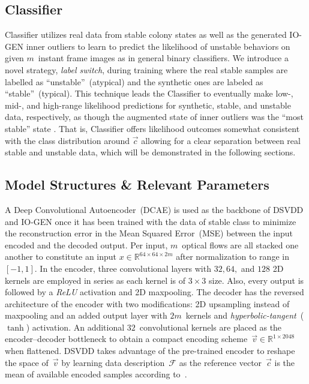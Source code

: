 \documentclass[letterpaper]{article} %
\begin{document}
\subsection{Classifier}
\label{sec:classifier}

Classifier utilizes real data from stable colony states as well as the
generated \mbox{IO-GEN} inner outliers to learn to predict the likelihood of
unstable behaviors on given $m$~instant frame images as in general
binary classifiers. We introduce a novel strategy, \emph{label switch}, during
training where the real stable samples are labelled as
``unstable''~(atypical) and the synthetic ones are labeled as
``stable''~(typical). This technique leads the Classifier to eventually
make \mbox{low-,} \mbox{mid-,} and high-range likelihood predictions for synthetic,
stable, and unstable data, respectively, as though the augmented state
of inner outliers was the ``most stable'' state . That is, Classifier
offers likelihood outcomes somewhat consistent with the class
distribution around $\vec{c}$ allowing for a clear separation between
real stable and unstable data, which will be demonstrated in
the following sections.

\subsection{Model Structures \& Relevant Parameters}
\label{sec:model_structures}

A Deep Convolutional Autoencoder~(DCAE) is used as the backbone of DSVDD
and \mbox{IO-GEN} once it has been trained with the data of stable class to
minimize the reconstruction error in the Mean Squared Error~(MSE)
between the input encoded and the decoded output. Per input,
$m$~optical flows are all stacked one another to constitute an
input $x \in \mathbb{R}^{64 \times 64 \times 2m}$ after normalization to
range in $[-1, 1]$. In the encoder, three convolutional layers with $32,
64,$ and $128$ 2D kernels are employed in series as each kernel is of $3
\times 3$ size. Also, every output is followed by a \emph{ReLU}
activation and 2D maxpooling. The decoder has the reversed architecture
of the encoder with two modifications: 2D upsampling instead of
maxpooling and an added output layer with $2m$~kernels and
\emph{hyperbolic-tangent}~($\tanh$) activation.
An additional $32$~convolutional kernels are placed as the
encoder--decoder bottleneck to obtain a compact
encoding scheme~$\vec{v} \in \mathbb{R}^{1 \times 2048}$ when flattened.
DSVDD takes advantage of the pre-trained encoder to reshape the space
of~$\vec{v}$ by learning data description~$\mathcal{F}$ as the reference
vector~$\vec{c}$ is the mean of available encoded
samples according to~\citet{RVGDSBMK18}.
\end{document}
